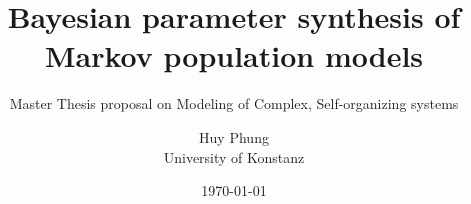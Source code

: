 \documentclass[12pt]{article}
\title{Bayesian parameter synthesis of Markov population models}
\subtitle{Master Thesis proposal on Modeling of Complex, Self-organizing systems}
\author{Huy Phung\\University of Konstanz}
\date{\today}
\theoremstyle{definition}
\begin{document}
\maketitle
\pagebreak
\tableofcontents
\pagebreak
\end{document}
